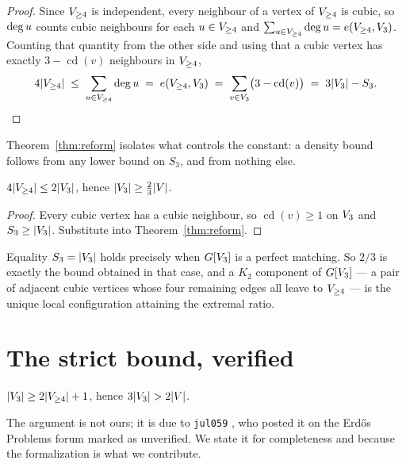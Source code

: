 \documentclass[11pt,a4paper]{article}
\begin{document}
\begin{proof}
Since $V_{\ge 4}$ is independent, every neighbour of a vertex of $V_{\ge 4}$ is cubic, so
$\operatorname{deg} u$ counts cubic neighbours for each $u \in V_{\ge 4}$ and
$\sum_{u \in V_{\ge 4}} \operatorname{deg} u = e(V_{\ge 4}, V_{3})$. Counting that quantity from the other
side and using that a cubic vertex has exactly $3 - \operatorname{cd}(v)$ neighbours in
$V_{\ge 4}$,
\[
  4\lvert V_{\ge 4} \rvert
  \;\le\; \sum_{u \in V_{\ge 4}} \operatorname{deg} u
  \;=\; e(V_{\ge 4}, V_{3})
  \;=\; \sum_{v \in V_{3}}\bigl(3 - \operatorname{cd}(v)\bigr)
  \;=\; 3\lvert V_{3} \rvert - S_3. \qedhere
\]
\end{proof}

Theorem~\ref{thm:reform} isolates what controls the constant: a density bound follows from
any lower bound on $S_3$, and from nothing else.

\begin{corollary}\label{cor:bisch}
$4\lvert V_{\ge 4} \rvert \le 2\lvert V_{3} \rvert$, hence
$\lvert V_{3} \rvert \ge \tfrac{2}{3}\lvert V \rvert$. 
\end{corollary}

\begin{proof}
Every cubic vertex has a cubic neighbour, so $\operatorname{cd}(v) \ge 1$ on $V_{3}$ and
$S_3 \ge \lvert V_{3} \rvert$. Substitute into Theorem~\ref{thm:reform}.
\end{proof}

\begin{observation}\label{obs:matching}
Equality $S_3 = \lvert V_{3} \rvert$ holds precisely when $G[V_{3}]$ is a perfect matching.
So $2/3$ is exactly the bound obtained in that case, and a $K_2$ component of
$G[V_{3}]$ --- a pair of adjacent cubic vertices whose four remaining edges all leave to
$V_{\ge 4}$ --- is the unique local configuration attaining the extremal ratio.
\end{observation}

\section{The strict bound, verified}\label{sec:strict}

\begin{theorem}\label{thm:strict}
$\lvert V_{3} \rvert \ge 2\lvert V_{\ge 4} \rvert + 1$, hence
$3\lvert V_{3} \rvert > 2\lvert V \rvert$. 
\end{theorem}

The argument is not ours; it is due to \texttt{jul059} \cite{jul059}, who posted it on the
Erd\H{o}s Problems forum marked as unverified. We state it for completeness and because the
formalization is what we contribute.
\end{document}
